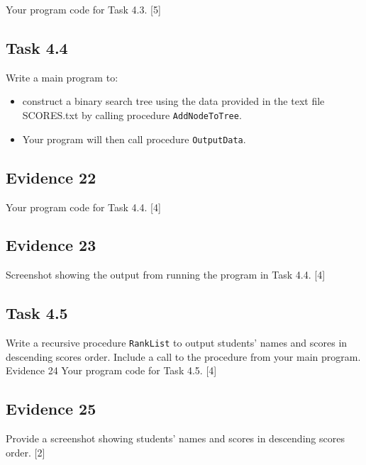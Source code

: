 Your program code for Task 4.3.\hfill{} {[}5{]}

\subsection*{Task 4.4 }

Write a main program to: 
\begin{itemize}
\item construct a binary search tree using the data provided in the text
file SCORES.txt by calling procedure \texttt{AddNodeToTree}. 
\item Your program will then call procedure \texttt{OutputData}. 
\end{itemize}

\subsection*{Evidence 22 }

Your program code for Task 4.4.\hfill{} {[}4{]}

\subsection*{Evidence 23 }

Screenshot showing the output from running the program in Task 4.4.\hfill{}
{[}4{]}

\subsection*{Task 4.5}

Write a recursive procedure \texttt{RankList} to output students\textquoteright{}
names and scores in descending scores order. Include a call to the
procedure from your main program. Evidence 24 Your program code for
Task 4.5.\hfill{} {[}4{]}

\subsection*{Evidence 25 }

Provide a screenshot showing students\textquoteright{} names and scores
in descending scores order. \hfill{}{[}2{]}